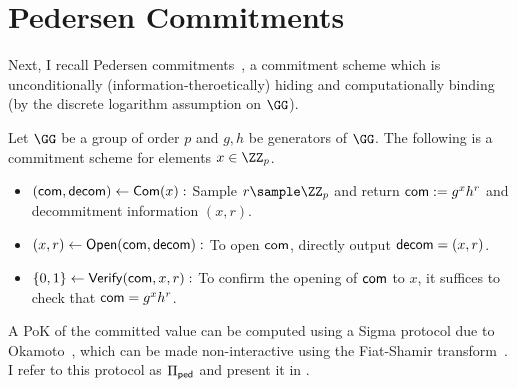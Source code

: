 \section{Pedersen Commitments}\label{sec:pedersen}

Next, I recall Pedersen commitments~\cite{C:Pedersen91}, a commitment scheme which is unconditionally (information-theroetically) hiding and computationally binding (by the discrete logarithm assumption on $\GG$). %

\begin{construction}
Let $\GG$ be a group of order $p$ and $g,h$ be generators of $\GG$. The following is a commitment scheme for elements $x \in \ZZ_p$.
\begin{itemize}
    \item \underline{$(\mathsf{com}, \mathsf{decom}) \gets \mathsf{Com}(x):$} Sample $r \sample \ZZ_p$ and return $\mathsf{com} := g^x h^r$ and decommitment information $(x, r)$.
    \item \underline{$(x, r) \gets \mathsf{Open}(\mathsf{com}, \mathsf{decom}):$} To open $\mathsf{com}$, directly output $\mathsf{decom} = (x, r)$.
    \item \underline{$\{0,1\} \gets {\mathsf{Verify}}(\mathsf{com}, x, r):$} To confirm the opening of $\mathsf{com}$ to $x$, it suffices to check that $\mathsf{com} = g^x h^r$.
\end{itemize}
\end{construction}

A PoK of the committed value can be computed using a Sigma protocol due to Okamoto~\cite{C:Okamoto92}, which can be made non-interactive using the Fiat-Shamir transform~\cite{C:FiaSha86}. I refer to this protocol as $\Pi_{\sf ped}$ and present it in .


